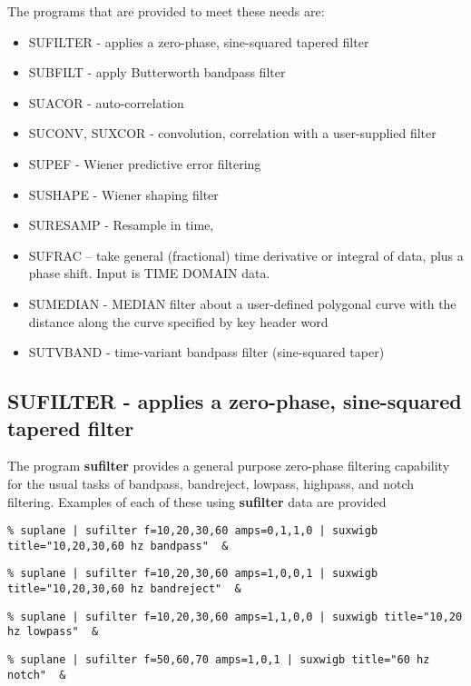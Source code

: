 {{{{{{{The programs that are provided to meet these needs are:
\begin{itemize}
\item SUFILTER - applies a zero-phase, sine-squared tapered filter 
\item SUBFILT - apply Butterworth bandpass filter
\item SUACOR - auto-correlation
\item SUCONV, SUXCOR - convolution, correlation with a user-supplied filter
\item SUPEF - Wiener predictive error filtering
\item SUSHAPE - Wiener shaping filter 
\item SURESAMP - Resample in time,
\item SUFRAC -- take general (fractional) time derivative or integral of
data, plus a phase shift.  Input is TIME DOMAIN data.
\item SUMEDIAN - MEDIAN filter about a user-defined polygonal curve with     
the distance along the curve specified by key header word 
\item SUTVBAND - time-variant bandpass filter (sine-squared taper)
\end{itemize}

\subsection{SUFILTER - applies a zero-phase, sine-squared tapered filter}
The program {\bf sufilter\/} provides a general purpose zero-phase filtering
capability for the usual tasks of bandpass, bandreject, lowpass, highpass,
and notch filtering.  Examples of each of these using {\bf sufilter\/}
data are provided
{\small \begin{verbatim}
% suplane | sufilter f=10,20,30,60 amps=0,1,1,0 | suxwigb title="10,20,30,60 hz bandpass"  &
\end{verbatim}}\noindent
{\small \begin{verbatim}
% suplane | sufilter f=10,20,30,60 amps=1,0,0,1 | suxwigb title="10,20,30,60 hz bandreject"  &
\end{verbatim}}\noindent
{\small \begin{verbatim}
% suplane | sufilter f=10,20,30,60 amps=1,1,0,0 | suxwigb title="10,20 hz lowpass"  &
\end{verbatim}}\noindent
{\small \begin{verbatim}
% suplane | sufilter f=50,60,70 amps=1,0,1 | suxwigb title="60 hz notch"  &
\end{verbatim}}\noindent

}}}}}}}
